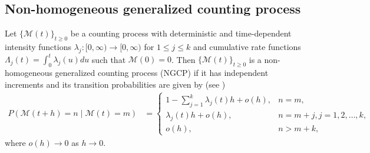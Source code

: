 \documentclass[11pt,oneside,reqno]{amsart}
\theoremstyle{definition}
\theoremstyle{remarkstyle}
\begin{document}
\subsection{Non-homogeneous generalized counting process}\label{ngcp}
 Let $\{\mathcal{M}(t)\}_{t\geq 0}$ be a counting process with deterministic and time-dependent intensity functions $\lambda_j:[0,\infty)\to [0,\infty)$ for $ 1\leq j \leq k$ and cumulative rate functions $\Lambda_{j}(t)=\int_{0}^{t}\lambda_{j}(u)du$ such that $\mathcal{M}(0)=0$. Then $\{\mathcal{M}(t)\}_{t\geq 0}$ is a non-homogeneous generalized counting process (NGCP) if it has independent increments and its transition probabilities are given by (see \citet{Kataria2025})
\begin{align*}
P(\mathcal{M}(t+h)=n\mid\mathcal{M}(t)=m) &=
\begin{cases}
1 - \sum_{j=1}^{k}\lambda_j(t)h + o(h), & n=m, \\
\lambda_j(t)h + o(h), & n=m+j, j=1,2,\ldots,k, \\
o(h), & n>m+k,
\end{cases}
\end{align*}
where $o(h)\rightarrow 0$ as $h\rightarrow 0$.
\end{document}
